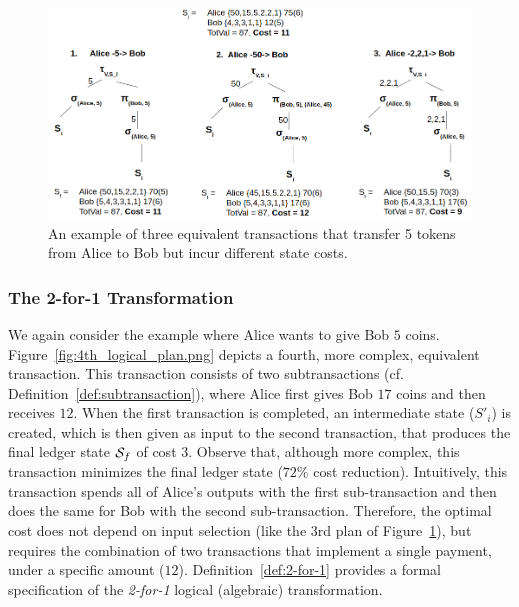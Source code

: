 \begin{figure}[h!]
    \centering
    \includegraphics[width=1\columnwidth,keepaspectratio]{figures/utxo_growth/3-logical-plans.png}
    \caption{An example of three equivalent transactions that transfer 5
    tokens from Alice to Bob but incur different state costs.}
    \label{fig:3-logical-plans}
\end{figure}

\subsubsection{The 2-for-1 Transformation}\label{sec:2-for-1}

We again consider the example where Alice wants to give Bob $5$ coins.
Figure~\ref{fig:4th_logical_plan.png} depicts a fourth, more complex,
equivalent transaction. This transaction consists of two subtransactions (cf.
Definition~\ref{def:subtransaction}), where Alice first gives Bob $17$ coins
and then receives $12$.
When the first transaction is completed, an intermediate state ($S'_i$) is
created, which is then given as input to the second transaction, that produces
the final ledger state $\mathcal{S}_f$ of cost $3$. Observe that, although
more complex, this transaction minimizes the final ledger state ($72\%$ cost
reduction). Intuitively, this transaction spends all of Alice's outputs with
the first sub-transaction and then does the same for Bob with the second
sub-transaction. Therefore, the optimal cost does not depend on input selection
(like
the 3rd plan of Figure~\ref{fig:3-logical-plans}), but requires the combination
of two transactions that implement a single payment, under a specific
amount ($12$). Definition~\ref{def:2-for-1} provides a formal specification of
the \emph{2-for-1} logical (algebraic) transformation.

